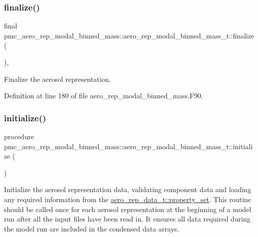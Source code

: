 \subsubsection{\texorpdfstring{finalize()}{finalize()}}
{\footnotesize\ttfamily final pmc\+\_\+aero\+\_\+rep\+\_\+modal\+\_\+binned\+\_\+mass\+::aero\+\_\+rep\+\_\+modal\+\_\+binned\+\_\+mass\+\_\+t\+::finalize (\begin{DoxyParamCaption}{ }\end{DoxyParamCaption})\hspace{0.3cm}{\ttfamily [final]}, {\ttfamily [private]}}



Finalize the aerosol representation. 



Definition at line 180 of file aero\+\_\+rep\+\_\+modal\+\_\+binned\+\_\+mass.\+F90.

\mbox{\label{structpmc__aero__rep__modal__binned__mass_1_1aero__rep__modal__binned__mass__t_aa541d9a673528ca3425ed237e8a853c2}} 
\subsubsection{\texorpdfstring{initialize()}{initialize()}}
{\footnotesize\ttfamily procedure pmc\+\_\+aero\+\_\+rep\+\_\+modal\+\_\+binned\+\_\+mass\+::aero\+\_\+rep\+\_\+modal\+\_\+binned\+\_\+mass\+\_\+t\+::initialize (\begin{DoxyParamCaption}{ }\end{DoxyParamCaption})\hspace{0.3cm}{\ttfamily [private]}}



Initialize the aerosol representation data, validating component data and loading any required information from the {\ttfamily \mbox{\hyperlink{structpmc__aero__rep__data_1_1aero__rep__data__t_a87b1bf5cd10a0a2b51390fb24ebf56c5}{aero\+\_\+rep\+\_\+data\+\_\+t\+::property\+\_\+set}}}. This routine should be called once for each aerosol representation at the beginning of a model run after all the input files have been read in. It ensures all data required during the model run are included in the condensed data arrays. 



